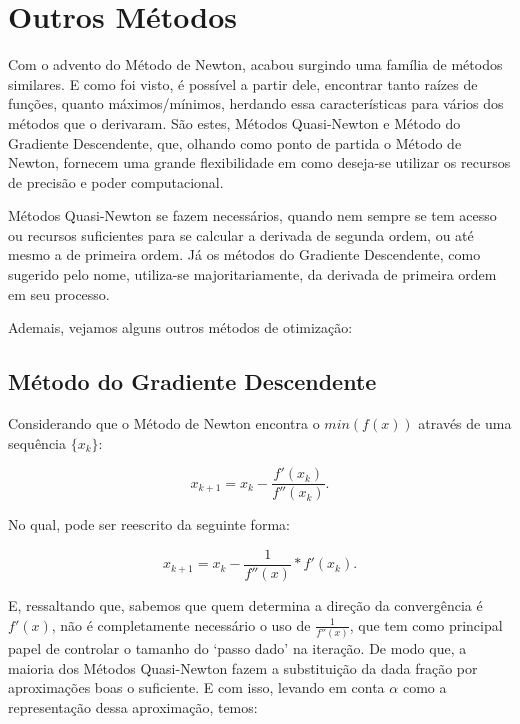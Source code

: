\section{{Outros Métodos}}

\hspace{0.8cm}
Com o advento do Método de Newton, acabou surgindo uma família de métodos
similares. E como foi visto, é possível a partir dele, encontrar tanto raízes
de funções, quanto máximos/mínimos, herdando essa características para vários
dos métodos que o derivaram. São estes, Métodos Quasi-Newton e Método do
Gradiente Descendente, que, olhando como ponto de partida o Método de Newton,
fornecem uma grande flexibilidade em como deseja-se utilizar os recursos de
precisão e poder computacional.

Métodos Quasi-Newton se fazem necessários, quando nem sempre se tem acesso ou
recursos suficientes para se calcular a derivada de segunda ordem, ou até mesmo
a de primeira ordem. Já os métodos do Gradiente Descendente, como sugerido pelo
nome, utiliza-se majoritariamente, da derivada de primeira ordem em seu
processo.

Ademais, vejamos alguns outros métodos de otimização:

\subsection{Método do Gradiente Descendente}

Considerando que o Método de Newton encontra o \(min(f(x))\) através de uma
sequência \(\{x_k\}\):

\begin{equation}
    x_{k+1} = x_{k} - \frac {f'(x_{k})}{f''(x_{k})}.
\end{equation}

No qual, pode ser reescrito da seguinte forma:

\begin{equation}
    x_{k+1} = x_{k} -  \frac{1}{f''(x)} * f'(x_{k}).
\end{equation}

E, ressaltando que, sabemos que quem determina a direção da convergência é
\(f'(x)\), não é completamente necessário o uso de \( \frac{1}{f''(x)} \), que
tem como principal papel de controlar o tamanho do `passo dado' na iteração.
De modo que, a maioria dos Métodos Quasi-Newton fazem a substituição
da dada fração por aproximações boas o suficiente. E com isso, levando em
conta $\alpha$ como a representação dessa aproximação, temos:

